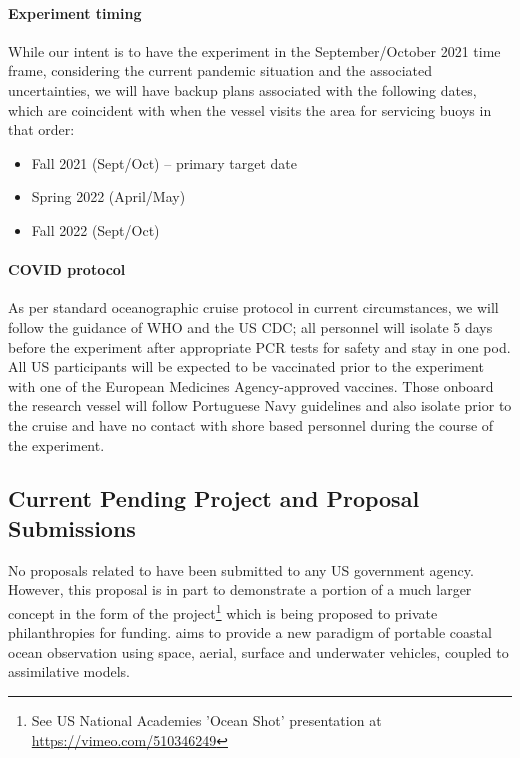 \paragraph{Experiment timing} While our intent is to have the
experiment in the September/October 2021 time frame, considering the
current pandemic situation and the associated uncertainties, we will
have backup plans associated with the following dates, which are
coincident with when the \inst vessel visits the \naz area for
servicing buoys in that order:

\begin{itemize}[noitemsep,topsep=0pt,parsep=0pt,partopsep=0pt]
\vspace{+0.25cm}
\item Fall 2021 (Sept/Oct) -- primary target date
\item Spring 2022 (April/May)
\item Fall 2022 (Sept/Oct) 

\end{itemize}  

\paragraph{COVID protocol} As per standard oceanographic cruise
protocol in current circumstances, we will follow the guidance of WHO
and the US CDC; all personnel will isolate 5 days before the
experiment after appropriate PCR tests for safety and stay in one
pod. All US participants will be expected to be vaccinated prior to
the experiment with one of the European Medicines Agency-approved
vaccines. Those onboard the \inst research vessel will follow
Portuguese Navy guidelines and also isolate prior to the cruise and
have no contact with shore based personnel during the course of the
experiment.


\subsection{Current Pending Project and Proposal Submissions}

No proposals related to \proj have been submitted to any US government
agency. However, this proposal is in part to demonstrate a portion of
a much larger concept in the form of the \met project\footnote{See US
  National Academies 'Ocean Shot' presentation at
  \url{https://vimeo.com/510346249}} which is being proposed to
private philanthropies for funding. \met aims to provide a new
paradigm of portable coastal ocean observation using space, aerial,
surface and underwater vehicles, coupled to assimilative models.

